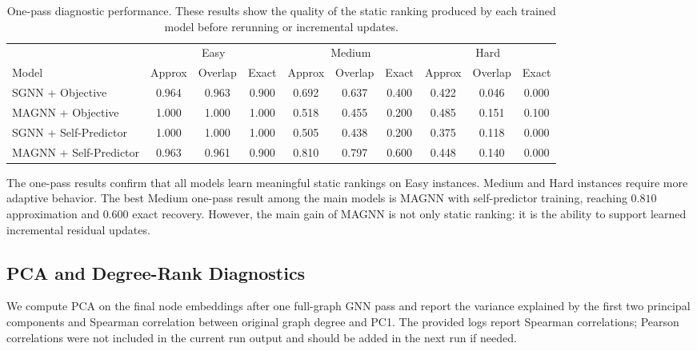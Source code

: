\begin{table}[t]
  \centering
  \small
  \begin{tabular}{l|ccc|ccc|ccc}
    \toprule
    & \multicolumn{3}{c|}{Easy} & \multicolumn{3}{c|}{Medium} & \multicolumn{3}{c}{Hard} \\
    Model & Approx & Overlap & Exact & Approx & Overlap & Exact & Approx & Overlap & Exact \\
    \midrule
    SGNN + Objective & 0.964 & 0.963 & 0.900 & 0.692 & 0.637 & 0.400 & 0.422 & 0.046 & 0.000 \\
    MAGNN + Objective & 1.000 & 1.000 & 1.000 & 0.518 & 0.455 & 0.200 & 0.485 & 0.151 & 0.100 \\
    SGNN + Self-Predictor & 1.000 & 1.000 & 1.000 & 0.505 & 0.438 & 0.200 & 0.375 & 0.118 & 0.000 \\
    MAGNN + Self-Predictor & 0.963 & 0.961 & 0.900 & 0.810 & 0.797 & 0.600 & 0.448 & 0.140 & 0.000 \\
    \bottomrule
  \end{tabular}
  \caption{One-pass diagnostic performance. These results show the quality of the static ranking produced by each trained model before rerunning or incremental updates.}
  \label{tab:one-pass-diagnostics}
\end{table}

The one-pass results confirm that all models learn meaningful static rankings on Easy instances. Medium and Hard instances require more adaptive behavior. The best Medium one-pass result among the main models is MAGNN with self-predictor training, reaching $0.810$ approximation and $0.600$ exact recovery. However, the main gain of MAGNN is not only static ranking: it is the ability to support learned incremental residual updates.

\subsection{PCA and Degree-Rank Diagnostics}

We compute PCA on the final node embeddings after one full-graph GNN pass and report the variance explained by the first two principal components and Spearman correlation between original graph degree and PC1. The provided logs report Spearman correlations; Pearson correlations were not included in the current run output and should be added in the next run if needed.

